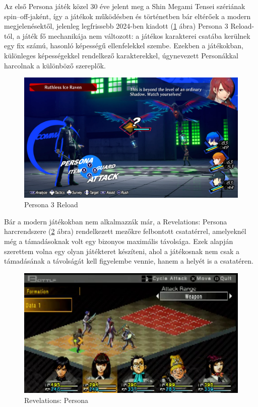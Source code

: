 \documentclass[
]{thesis-ekf}
\theoremstyle{definition}
\theoremstyle{remark}
\begin{document}
Az első Persona játék közel 30 éve jelent meg a Shin Megami Tensei szériának spin--off-jaként, így a játékok működésben és történetben bár eltérőek a modern megjelenésektől, jelenleg legfrissebb 2024-ben kiadott (\ref{persona3} ábra) Persona 3 Reload-tól, a játék fő mechanikája nem változott: a játékos karakterei csatába kerülnek egy fix számú, hasonló képességű ellenfelekkel szembe. Ezekben a játékokban, különleges képességekkel rendelkező karakterekkel, úgynevezett Personákkal harcolnak a különböző szereplők. \cite{Persona3}

\begin{figure}[h!]
	\centering
	\includegraphics[width=15cm]{./pictures/persona3_xbox.png}
	\caption{Persona 3 Reload}
	\label{persona3}
\end{figure}

Bár a modern játékokban nem alkalmazzák már, a Revelations: Persona harcrendszere (\ref{persona1} ábra) rendelkezett mezőkre felbontott csatatérrel, amelyeknél még a támadásoknak volt egy bizonyos maximális távolsága. Ezek alapján szerettem volna egy olyan játékteret készíteni, ahol a játékosnak nem csak a támadásának a távolságát kell figyelembe vennie, hanem a helyét is a csatatéren. \cite{Persona1,Persona1Gameplay}

\begin{figure}[h!]
	\centering
	\includegraphics[width=13cm]{./pictures/persona_psp.png}
	\caption{Revelations: Persona}
	\label{persona1}
\end{figure}
\end{document}

